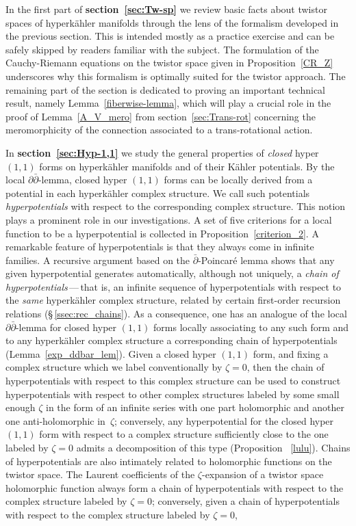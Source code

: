 \documentclass[11pt]{amsart}
\theoremstyle{remark}
\theoremstyle{remark}
\theoremstyle{definition}
\theoremstyle{definition}
\theoremstyle{definition}
\newcommand{\0}{{\scriptstyle 0'}} %
\newcommand{\1}{{\scriptstyle 1'}}
\newcommand{\pt}{\hspace{1pt}} %
\newcommand{\hp}{\hspace{0.5pt}} %
\begin{document}
In the first part of \textbf{section~\ref{sec:Tw-sp}} we review basic facts about twistor spaces of hyperk\"ahler \pagebreak manifolds through the lens of the formalism developed in the previous section. This is intended mostly as a practice exercise and can be safely skipped by readers familiar with the subject. The formulation of the Cauchy-Riemann equations on the twistor space given in Proposition~\ref{CR_Z} underscores why this formalism is optimally suited for the twistor approach. The remaining part of the section is dedicated to proving an important technical result, namely Lemma~\ref{fiberwise-lemma}, which will play a crucial role in the proof of Lemma~\ref{A_V_mero} from section~\ref{sec:Trans-rot} concerning the meromorphicity of the connection associated to a trans-rotational action. 


In \textbf{section~\ref{sec:Hyp-1,1}} we study the general properties of \emph{closed} hyper \mbox{$(1,1)$} forms on hyperk\"ahler manifolds and of their K\"ahler potentials. By the local $\partial\bar{\partial}$\pt-\hp lemma, closed hyper $(1,1)$ forms can be locally derived from a potential in each hyperk\"ahler complex structure. We call such potentials \textit{hyperpotentials} with respect to the corresponding complex structure. This notion plays a prominent role in our investigations. A set of five criterions for a local function to be a hyperpotential is collected in Proposition~\ref{criterion_2}. A remarkable feature of hyperpotentials is that they always come in infinite families. A recursive argument based on the \mbox{$\bar{\partial}$\pt-\hp Poincar\'e} lemma shows that any given hyperpotential generates automatically, although not uniquely, a \textit{chain of hyper\-potentials}\,---\,that is, an infinite sequence of hyperpotentials with respect to the \textit{same} hyperk\"ahler complex structure, related by certain first-order recursion relations (\mbox{\S\,\ref{ssec:rec_chains}}). As a consequence, one has an analogue of the local $\partial\bar{\partial}$\pt-\hp lemma for closed hyper \mbox{$(1,1)$} forms locally associating to any such form and to any hyperk\"ahler complex structure a corresponding chain of hyperpotentials (Lemma~\ref{exp_ddbar_lem}). Given a closed hyper \mbox{$(1,1)$} form, and fixing a complex structure which we label conventionally by \mbox{$\zeta = 0$}, then the chain of hyperpotentials with respect to this complex structure can be used to construct hyperpotentials with respect to other complex structures labeled by some small enough $\zeta$ in the form of an infinite series with one part holomorphic and another one anti-holomorphic in~$\zeta$; conversely, any hyperpotential for the closed hyper \mbox{$(1,1)$} form with respect to a complex structure sufficiently close to the one labeled by \mbox{$\zeta = 0$} admits a decomposition of this type (Proposition~ \ref{lulu}). Chains of hyperpotentials are also intimately related to holomorphic functions on the twistor space. The Laurent coefficients of the $\zeta$-\pt expansion of a twistor space holomorphic function always form a chain of hyperpotentials with respect to the  complex structure labeled by \mbox{$\zeta = 0$}; conversely, given a chain of hyperpotentials with respect to the complex structure labeled by \mbox{$\zeta = 0$}, 
\end{document}

